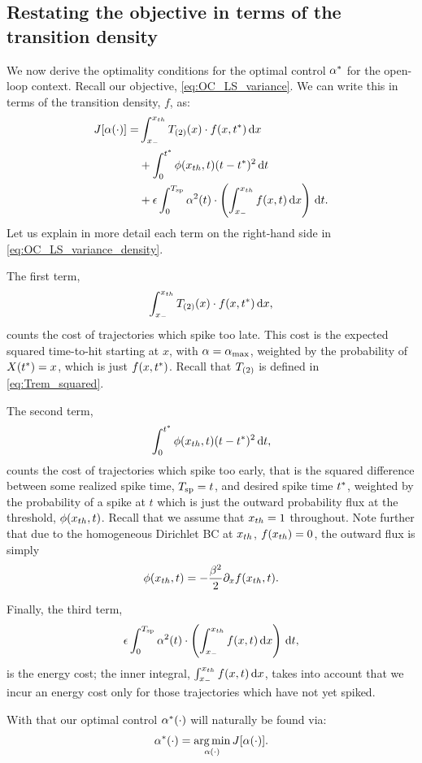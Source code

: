 \documentclass[12pt]{iopart}
\begin{document}
\subsection{Restating the objective in terms of the transition density}
We now derive the optimality conditions for the optimal control ${\alpha}^*$ for the
open-loop context. Recall our objective, \cref{eq:OC_LS_variance}.  
We can write this in terms of the transition density, $f$, as:
\begin{align}
J[{\alpha}(\cdot)] =&
\int_{ x_{-} }^{ x_{th} } { {T}_{(2)} }(x) \cdot f(x,{ t^* }) \, \mathrm{d} x
\notag
\\
&+ \int_0^{ t^* } \phi({ x_{th} }, t) (t-{ t^* })^2 \, \mathrm{d} t
\label{eq:OC_LS_variance_density}
\\
&+  {\epsilon} \int_0^{ T_{\textrm{sp} } }  {\alpha}^2(t)  \cdot \left(  \int_{ x_{-} }^{ x_{th} } f(x,t) \, \mathrm{d} x
\right)
\, \mathrm{d} t.
\notag
\end{align}
Let us explain in more detail each term on the right-hand side in
\cref{eq:OC_LS_variance_density}.

The first term, $$ \int_{ x_{-} }^{ x_{th} } { {T}_{(2)} }(x) \cdot f(x,{ t^* })\, \mathrm{d} x, $$ counts the
cost of trajectories which spike too late. This cost is the expected squared time-to-hit starting at $x$, with  ${\alpha} = { {\alpha}_{\textrm{max}} }$, weighted by the
probability of $X({ t^* }) = x$, which is just $f(x,{ t^* })$. Recall that ${ {T}_{(2)} }$ is
defined in \cref{eq:Trem_squared}.

The second term, $$ \int_0^{ t^* } \phi({ x_{th} },t) (t-{ t^* })^2 \, \mathrm{d} t, $$ counts the cost
of trajectories which spike too early, that is the squared difference between
some realized spike time, ${ T_{\textrm{sp} } } = t$, and desired spike time ${ t^* }$, weighted by
the probability of a spike at $t$ which is just the outward probability flux at
the threshold, $\phi({ x_{th} },t)$. Recall that we assume that ${ x_{th} } = 1$ throughout.
Note further that due to the homogeneous Dirichlet BC at ${ x_{th} }$, $f({ x_{th} }) = 0$, the outward flux is simply $$ \phi({ x_{th} }, t) = -\frac{{\beta}^2 }{2} {\partial}_x f({ x_{th} },
t).$$

Finally, the third term,
$$
{\epsilon} \int_0^{ T_{\textrm{sp} } }  {\alpha}^2(t)  \cdot \left(  \int_{ x_{-} }^{ x_{th} } f(x,t) \, \mathrm{d} x \right)
\, \mathrm{d} t, $$
is the energy cost; the inner integral, $\int_{ x_{-} }^{ x_{th} } f(x,t) \, \mathrm{d} x$,
takes into account that we incur an energy cost only for those trajectories
which have not yet spiked.

With that our optimal control ${\alpha}^*(\cdot)$ will naturally be found via:
$$
\a^*(\cdot) = \argmin_{\a(\cdot)} J[\a(\cdot)].
$$
\end{document}
